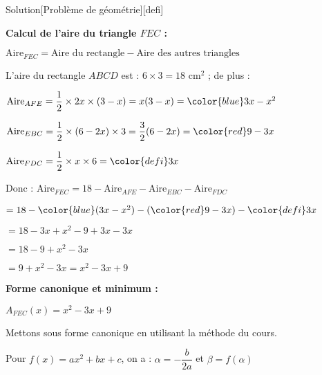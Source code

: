 \documentclass[a4paper,11pt,fleqn]{article}
\begin{document}
\begin{bfEnv}{Solution}[Problème de géométrie][defi]
\begin{MultiColonnes}{2}
\end{MultiColonnes}
\begin{tcbenumerate}[2]
\tcbitem[raster multicolumn=2] \textbf{Calcul de l'aire du triangle $FEC$ :}

\begin{MultiColonnes}{2}
\tcbitem $\text{Aire}_{FEC} = \text{Aire du rectangle} - \text{Aire des autres triangles}$

L'aire du rectangle $ABCD$ est : $6 \times 3 = 18$ cm$^2$ ; de plus :

\begin{MultiColonnes}{1}
    \tcbitem $\text{Aire}_{AFE} = \dfrac{1}{2} \times 2x \times (3-x) = x(3-x) =  {\color{blue}3x-x^2}$

    \tcbitem $\text{Aire}_{EBC} = \dfrac{1}{2} \times (6-2x) \times 3 = \dfrac{3}{2}(6-2x) =  {\color{red}9-3x}$

    \tcbitem $\text{Aire}_{FDC} = \dfrac{1}{2} \times x \times 6 =  {\color{defi}3x}$

\end{MultiColonnes}

\tcbitem Donc :
$\text{Aire}_{FEC} = 18 - \text{Aire}_{AFE} - \text{Aire}_{EBC} - \text{Aire}_{FDC}$

$= 18 -  {\color{blue}(3x-x^2)} - ( {\color{red}9-3x}) -  {\color{defi}3x}$

$= 18 - 3x + x^2 - 9 + 3x - 3x$

$= 18 - 9 + x^2 - 3x$

$= 9 + x^2 - 3x = x^2 - 3x + 9$
\end{MultiColonnes}



\tcbitem \textbf{Forme canonique et minimum :}

$A_{FEC}(x) = x^2 - 3x + 9$

Mettons sous forme canonique en utilisant la méthode du cours.

Pour $f(x) = ax^2 + bx + c$, on a : $\alpha = -\dfrac{b}{2a}$ et $\beta = f(\alpha)$


\end{tcbenumerate}
\end{bfEnv}
\end{document}
